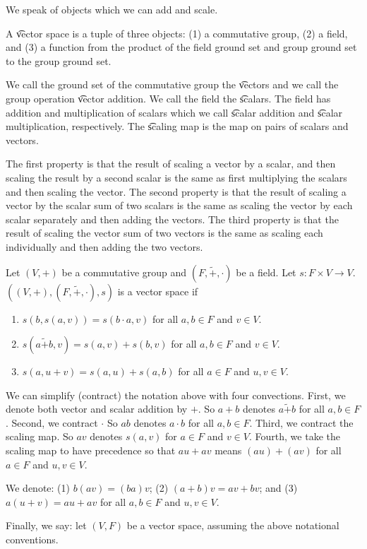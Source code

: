 

We speak of objects which we can add and scale.


A \t{vector space} is a tuple of three objects:
(1) a commutative group, (2) a field, and (3) a function from the product of the field ground set and group ground set to the group ground set.

We call the ground set of the commutative group the \t{vectors} and we call the group operation \t{vector addition}.
We call the field the \t{scalars}.
The field has addition and multiplication of scalars which we call \t{scalar addition} and \t{scalar multiplication}, respectively.
The \t{scaling map} is the map on pairs of scalars and vectors.

The first property is that the result of scaling a vector by a scalar, and then scaling the result by a second scalar is the same as first multiplying the scalars and then scaling the vector.
The second property is that the result of scaling a vector by the scalar sum of two scalars is the same as scaling the vector by each scalar separately and then adding the vectors.
The third property is that the result of scaling the vector sum of two vectors is the same as scaling each individually and then adding the two vectors.


Let $(V,+)$ be a commutative group and $(F, \tilde{+}, \cdot)$ be a field.
Let $s: F \times V \to V$.  $((V, +), (F, \tilde{+}, \cdot), s)$ is a vector space if
\begin{enumerate}
  \item $s(b,s(a, v)) = s(b \cdot a, v)$ for all $a, b \in F$ and $v \in V$.
  \item $s(a\tilde{+}b, v) = s(a, v) + s(b, v)$ for all $a, b \in F$ and $v \in V$.
  \item $s(a, u + v) = s(a,u) + s(a, b)$ for all $a \in F$ and $u, v \in V$.
\end{enumerate}

We can simplify (contract) the notation above with four convections.
First, we denote both vector
and scalar addition by $+$.
So $a + b$ denotes $a \tilde{+} b$
for all $a, b \in F$.
Second,
we contract $\cdot$
So $ab$ denotes $a \cdot b$
for all $a, b \in F$.
Third, we
contract the scaling map.
So $av$ denotes $s(a, v)$
for $a \in F$ and $v \in V$.
Fourth,
we take the scaling
map to have precedence so that
$au + av$ means $(au) + (av)$
for all $a \in F$ and $u,v \in V$.

We denote:
(1)
$b(av) = (ba)v$;
(2)
$(a+b)v = av + bv$;
and (3)
$a(u + v) = au + av$
for all
$a,b \in F$ and $u, v \in V$.

Finally, we say: let $(V, F)$
be a vector space, assuming the
above notational conventions.
